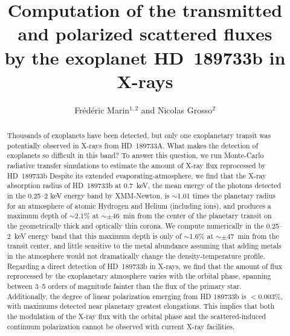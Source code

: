 \documentclass[iop]{emulateapj}
\begin{document}
\title{Computation of the transmitted and polarized scattered fluxes\\
by the exoplanet HD~189733\MakeLowercase{b} in X-rays}

\author{Fr\'ed\'eric Marin$^{1,2}$ and Nicolas Grosso$^2$}



\begin{abstract}
{Thousands of exoplanets have been detected, but only one exoplanetary transit was potentially observed in X-rays 
from HD~189733A. What makes the detection of exoplanets so difficult in this band? To answer this question, we run 
Monte-Carlo radiative transfer simulations to estimate the amount of X-ray flux reprocessed by HD~189733b
Despite its extended evaporating-atmosphere, we find that the X-ray absorption radius of HD~189733b at 0.7~keV, the 
mean energy of the photons detected in the 0.25--2 keV energy band by XMM-Newton, is $\sim$1.01 times the planetary 
radius for an atmosphere of atomic Hydrogen and Helium (including ions), and produces a maximum depth of $\sim$2.1\% 
at $\sim$$\pm46$~min from the center of the planetary transit on the geometrically thick and optically thin 
corona. We compute numerically in the 0.25--2~keV energy band that this maximum depth is only of 
$\sim$1.6\% at $\sim$$\pm47$~min from the transit center, and little sensitive to the metal abundance 
assuming that adding metals in the atmosphere would not dramatically change the density-temperature profile.
Regarding a direct detection of HD~189733b in X-rays, we find that the amount of flux reprocessed by the exoplanetary 
atmosphere varies with the orbital phase, spanning between 3--5 orders of magnitude fainter than the flux of the primary 
star. Additionally, the degree of linear polarization emerging from HD 189733b is $<$0.003\%, with maximums detected 
near planetary greatest elongations. This implies that both the modulation of the X-ray flux with the orbital phase and 
the scattered-induced continuum polarization cannot be observed with current X-ray facilities.}
\end{abstract}
\end{document}
